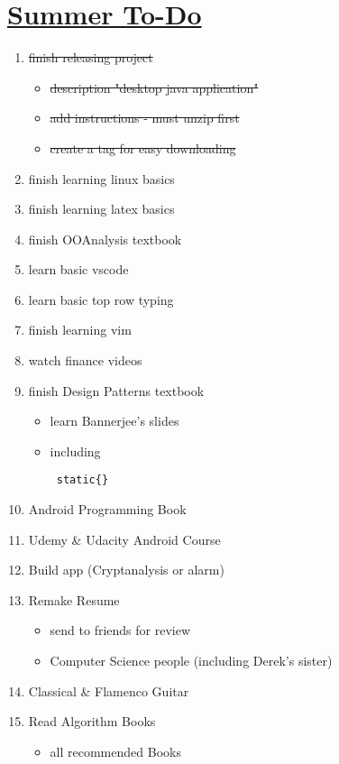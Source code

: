 \documentclass[10pt]{article}
\begin{document}
\section*{\underline{Summer To-Do}}

\begin{enumerate}
    \item \sout{finish releasing project}
    \begin{itemize}
	    \item \sout{description "desktop java application"}
	    \item \sout{add instructions - must unzip first}
        \item \sout{create a tag for easy downloading}
    \end{itemize}
    \item finish learning linux basics
    \item finish learning latex basics
    \item finish OOAnalysis textbook
    \item learn basic vscode
    \item learn basic top row typing
    \item finish learning vim
    \item watch finance videos
    \item finish Design Patterns textbook
    \begin{itemize}
            \item learn Bannerjee's slides
            \item including \begin{verbatim} static{} \end{verbatim}
    \end{itemize}
    \item Android Programming Book
    \item Udemy \& Udacity Android Course
    \item Build app (Cryptanalysis or alarm)
    \item Remake Resume
    \begin{itemize}
        \item send to friends for review
        \item Computer Science people (including Derek's sister)
    \end{itemize}
    \item Classical \& Flamenco Guitar
    \item Read Algorithm Books
    \begin{itemize}
        \item all recommended Books
    \end{itemize}

\end{enumerate}
\end{document}
